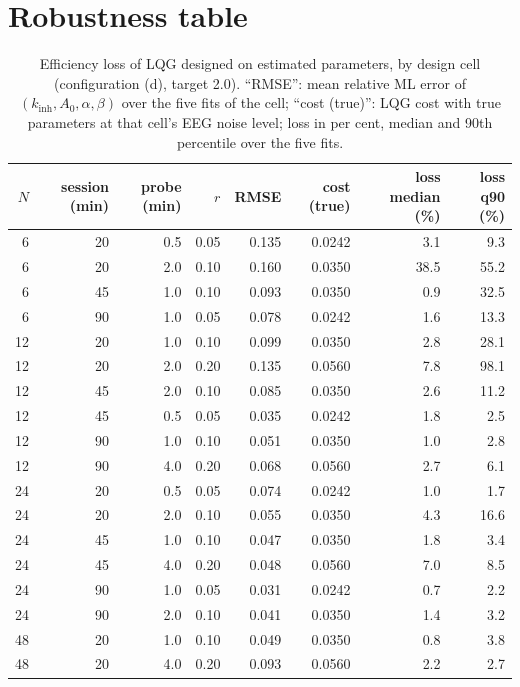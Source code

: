 \documentclass[12pt,a4paper]{article}
\theoremstyle{plain}
\theoremstyle{definition}
\theoremstyle{remark}
\newcommand{\kinh}{k_{\mathrm{inh}}}
\begin{document}
\clearpage
\section{Robustness table}
\label{app:robust}

\begin{table}[H]
\centering\footnotesize
\caption{Efficiency loss of LQG designed on estimated parameters, by design cell (configuration (d), target 2.0). ``RMSE'': mean relative ML error of $(\kinh,A_0,\alpha,\beta)$ over the five fits of the cell; ``cost (true)'': LQG cost with true parameters at that cell's EEG noise level; loss in per cent, median and 90th percentile over the five fits.}
\label{tab:robust}
\setlength{\tabcolsep}{4pt}
\begin{tabular}{rrrrrrrr}
\toprule
$N$ & session (min) & probe (min) & $r$ & RMSE & cost (true) & loss median (\%) & loss q90 (\%) \\
\midrule
 6 & 20 & 0.5 & 0.05 & 0.135 & 0.0242 &  3.1 &  9.3 \\
 6 & 20 & 2.0 & 0.10 & 0.160 & 0.0350 & 38.5 & 55.2 \\
 6 & 45 & 1.0 & 0.10 & 0.093 & 0.0350 &  0.9 & 32.5 \\
 6 & 90 & 1.0 & 0.05 & 0.078 & 0.0242 &  1.6 & 13.3 \\
12 & 20 & 1.0 & 0.10 & 0.099 & 0.0350 &  2.8 & 28.1 \\
12 & 20 & 2.0 & 0.20 & 0.135 & 0.0560 &  7.8 & 98.1 \\
12 & 45 & 2.0 & 0.10 & 0.085 & 0.0350 &  2.6 & 11.2 \\
12 & 45 & 0.5 & 0.05 & 0.035 & 0.0242 &  1.8 &  2.5 \\
12 & 90 & 1.0 & 0.10 & 0.051 & 0.0350 &  1.0 &  2.8 \\
12 & 90 & 4.0 & 0.20 & 0.068 & 0.0560 &  2.7 &  6.1 \\
24 & 20 & 0.5 & 0.05 & 0.074 & 0.0242 &  1.0 &  1.7 \\
24 & 20 & 2.0 & 0.10 & 0.055 & 0.0350 &  4.3 & 16.6 \\
24 & 45 & 1.0 & 0.10 & 0.047 & 0.0350 &  1.8 &  3.4 \\
24 & 45 & 4.0 & 0.20 & 0.048 & 0.0560 &  7.0 &  8.5 \\
24 & 90 & 1.0 & 0.05 & 0.031 & 0.0242 &  0.7 &  2.2 \\
24 & 90 & 2.0 & 0.10 & 0.041 & 0.0350 &  1.4 &  3.2 \\
48 & 20 & 1.0 & 0.10 & 0.049 & 0.0350 &  0.8 &  3.8 \\
48 & 20 & 4.0 & 0.20 & 0.093 & 0.0560 &  2.2 &  2.7 \\

\end{tabular}
\end{table}
\end{document}
